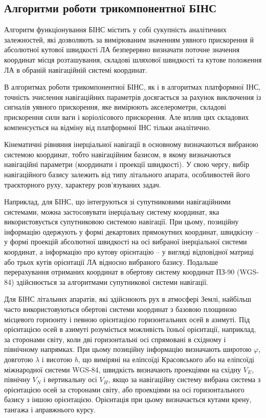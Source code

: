 
\subsection{Алгоритми роботи трикомпонентної БІНС}

Алгоритм функціонування БІНС містить у собі сукупність аналітичних залежностей, які 
дозволяють за вимірюваним значенням уявного прискорення й абсолютної кутової швидкості 
ЛА безперервно визначати поточне значення координат місця розташування, складові 
шляхової швидкості та кутове положення ЛА в обраній навігаційній системі координат.

В алгоритмах роботи  трикомпонентної БІНС, як і в алгоритмах платформної ІНС, точність 
зчислення навігаційних параметрів досягається за рахунок виключення із сигналів уявного 
прискорення, яке вимірюють акселерометри, складові прискорення сили ваги і коріолісового 
прискорення. Але вплив цих складових компенсується на відміну від платформної ІНС 
тільки аналітично. 

 Кінематичні рівняння інерціальної  навігації в основному визначаються вибраною системою 
координат, тобто навігаційним базисом, в якому визначаються навігаційні параметри 
(координати і проекції швидкості). У свою чергу, вибір навігаційного базису залежить 
від типу літального апарата, особливостей його траєкторного руху, характеру розв'язуваних 
задач.

Наприклад, для БІНС, що інтегруються зі супутниковими навігаційними системами, можна 
застосовувати інерціальну систему координат, яка використовується супутниковою системою 
навігації.  При цьому, позиційну інформацію одержують у формі декартових прямокутних 
координат, швидкісну -- у формі проекцій абсолютної швидкості на осі вибраної інерціальної 
системи координат, а інформацію про кутову орієнтацію -- у вигляді відповідної матриці 
або трьох кутів орієнтації ЛА відносно вибраного базису. Подальше перерахування отриманих 
координат в обертову систему координат ПЗ-90 (WGS-84) здійснюється за алгоритмами 
супутникової системи навігації.

Для БІНС літальних апаратів, які здійснюють рух в атмосфері Землі, найбільш часто 
використовуються обертові системи координат з базовою площиною місцевого горизонту 
і певною орієнтацією горизонтальних осей в азимуті. Під орієнтацією осей в азимуті 
розуміється можливість їхньої орієнтації, наприклад, за сторонами світу, коли дві 
горизонтальні осі спрямовані в східному і північному напрямках. При цьому позиційну 
інформацію визначають широтою $\varphi$, довготою $\lambda$ і висотою \textit{h}, 
що виміряні на еліпсоїді Красовського або на еліпсоїді міжнародної системи WGS-84, 
швидкість визначають проекціями на східну $V_E$, північну $V_N$ і вертикальну 
осі $V_H$, якщо за навігаційну систему вибрана система з орієнтацією осей за 
сторонами світу, або проекціями на осі горизонтального базису з іншою орієнтацією. 
Орієнтація при цьому визначається кутами крену, тангажа і аправжнього курсу.

